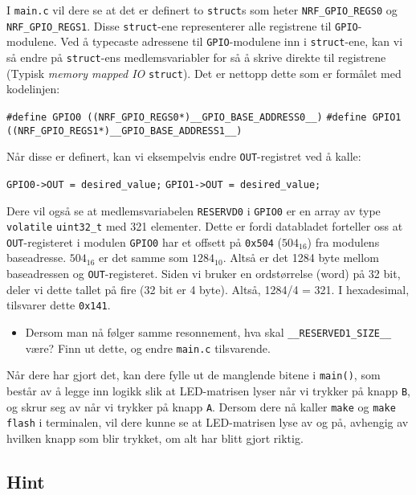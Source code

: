 I \verb|main.c| vil dere se at det er definert to \verb|struct|s som heter \verb|NRF_GPIO_REGS0| og \verb|NRF_GPIO_REGS1|. Disse \verb|struct|-ene representerer alle registrene til \verb|GPIO|-modulene. Ved å typecaste adressene til \verb|GPIO|-modulene inn i \verb|struct|-ene, kan vi så endre på \verb|struct|-ens medlemsvariabler for så å skrive direkte til registrene (Typisk \textit{memory mapped IO} \verb|struct|). Det er nettopp dette som er formålet med kodelinjen:

\verb|#define GPIO0 ((NRF_GPIO_REGS0*)__GPIO_BASE_ADDRESS0__)|\newline
\verb|#define GPIO1 ((NRF_GPIO_REGS1*)__GPIO_BASE_ADDRESS1__)|

Når disse er definert, kan vi eksempelvis endre \verb|OUT|-registret ved å kalle:

\verb|GPIO0->OUT = desired_value;|\newline
\verb|GPIO1->OUT = desired_value;|

 Dere vil også se at medlemsvariabelen \verb|RESERVD0| i \verb|GPIO0| er en array av type \verb|volatile| \verb|uint32_t| med 321 elementer. Dette er fordi databladet forteller oss at \verb|OUT|-registeret i modulen \verb|GPIO0| har et offsett på 
 \verb|0x504| ($\text{504}_{\text{16}}$) fra modulens baseadresse. $\text{504}_{\text{16}}$ er det samme som $\text{1284}_{\text{10}}$. Altså er det 1284 byte mellom baseadressen og \verb|OUT|-registeret. Siden vi bruker en ordstørrelse (word) på 32 bit, deler vi dette tallet på fire (32 bit er 4 byte). Altså, 1284/4 = 321. I hexadesimal, tilsvarer dette \verb|0x141|.
 
 \begin{itemize}
     \item Dersom man nå følger samme resonnement, hva skal \verb|__RESERVED1_SIZE__| være? Finn ut dette, og endre \verb|main.c| tilsvarende.
 \end{itemize}


Når dere har gjort det, kan dere fylle ut de manglende bitene i \verb|main()|, som består av å legge inn logikk slik at LED-matrisen lyser når vi trykker på knapp \verb|B|, og skrur seg av når vi trykker på knapp \verb|A|. Dersom dere nå kaller \verb|make| og \verb|make flash| i terminalen, vil dere kunne se at LED-matrisen lyse av og på, avhengig av hvilken knapp som blir trykket, om alt har blitt gjort riktig.


\subsection{Hint}\label{subsec:GPIO-hint}

